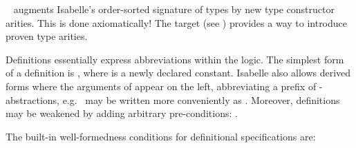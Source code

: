 \begin{isabellebody}
\begin{isamarkuptext}
\begin{description}
  \item \hyperlink{command.arities}{\mbox{}}~ augments
  Isabelle's order-sorted signature of types by new type constructor
  arities.  This is done axiomatically!  The \hyperlink{command.instantiation}{\mbox{}}
  target (see ) provides a way to introduce
  proven type arities.

  \end{description}%
\end{isamarkuptext}%
\isamarkuptrue%
%
\isamarkuptrue%
%
\begin{isamarkuptext}%
Definitions essentially express abbreviations within the logic.  The
  simplest form of a definition is , where  is a newly declared constant.  Isabelle also allows derived forms
  where the arguments of  appear on the left, abbreviating a
  prefix of -abstractions, e.g.\  may be
  written more conveniently as .  Moreover,
  definitions may be weakened by adding arbitrary pre-conditions:
  .

  \medskip The built-in well-formedness conditions for definitional
  specifications are:


\end{isamarkuptext}
\end{isabellebody}
